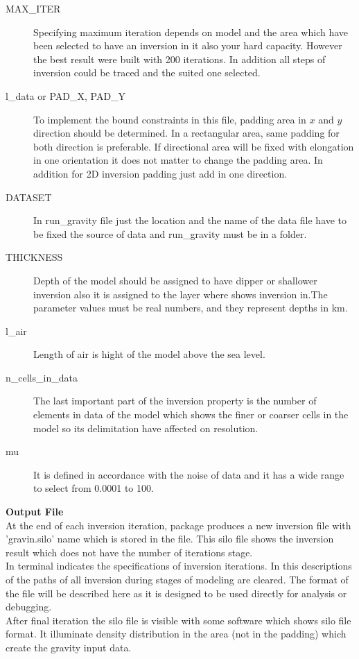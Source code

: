 \begin{description} 	
\item[MAX\_ITER]
Specifying maximum iteration depends on model and the area which have been selected to have an inversion in it also your hard capacity. However the best result were built with 200 iterations. In addition all steps of inversion could be traced and the suited one selected.

\item[l_data or PAD\_X, PAD\_Y] To implement the bound constraints in this file, padding area in $x$ and $y$ direction should be determined. In a rectangular area, same padding for both direction is preferable. If directional area will be fixed with elongation in one orientation it does not matter to change the padding area. In addition for 2D inversion padding just add in one direction.

\item[DATASET] In run_gravity file just the location and the name of the data file have to be fixed the source of data and run_gravity must be in a folder. 

\item[THICKNESS] Depth of the model should be assigned to have dipper or shallower inversion also it is assigned to the layer where shows inversion in.The parameter values must be real numbers, and they represent depths in km.

\item[l_air] Length of air is hight of the model above the sea level. 

\item[n_cells_in_data] The last important part of the inversion property is the number of elements in data of the model which shows the finer or coarser cells in the model so its delimitation have affected on resolution.

\item[mu]It is defined in accordance with the noise of data and it has a wide range to select from 0.0001 to 100.

\end{description}

\textbf{Output File}\\

At the end of each inversion iteration, package produces a new inversion file with 'gravin.silo' name which is stored in the file. This silo file shows the inversion result which does not have the number of iterations stage.\\
 In terminal indicates the specifications of inversion iterations. In this descriptions of the paths of all inversion during stages of modeling are cleared. The format of the file will be described here as it is designed to be used directly for analysis or debugging.\\
After final iteration the silo file is visible with some software which shows silo file format. It illuminate density distribution in the area (not in the padding) which create the gravity input data.\\

